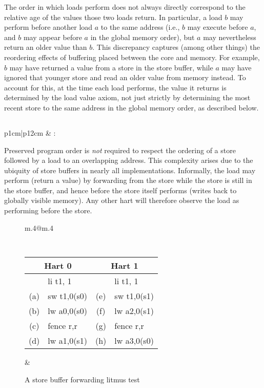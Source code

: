 The order in which loads perform does not always directly correspond to the relative age of the values those two loads return.
In particular, a load $b$ may perform before another load $a$ to the same address (i.e., $b$ may execute before $a$, and $b$ may appear before $a$ in the global memory order), but $a$ may nevertheless return an older value than $b$.
This discrepancy captures (among other things) the reordering effects of buffering placed between the core and memory.
For example, $b$ may have returned a value from a store in the store buffer, while $a$ may have ignored that younger store and read an older value from memory instead.
To account for this, at the time each load performs, the value it returns is determined by the load value axiom, not just strictly by determining the most recent store to the same address in the global memory order, as described below.

\subsection{}
\label{sec:memory:loadvalueaxiom}
\begin{tabular}{p{1cm}|p{12cm}} &
: \loadvalueaxiom
\end{tabular}

Preserved program order is {\em not} required to respect the ordering of a store followed by a load to an overlapping address.
This complexity arises due to the ubiquity of store buffers in nearly all implementations.
Informally, the load may perform (return a value) by forwarding from the store while the store is still in the store buffer, and hence before the store itself performs (writes back to globally visible memory).
Any other hart will therefore observe the load as performing before the store.

\begin{figure}[h!]
  \centering
  \begin{tabular}{m{.4\linewidth}@{\qquad}m{.4\linewidth}}
  {
    \tt\small
    \begin{tabular}{cl||cl}
    \multicolumn{2}{c}{Hart 0} & \multicolumn{2}{c}{Hart 1} \\
    \hline
          & li t1, 1    &     & li t1, 1    \\
      (a) & sw t1,0(s0) & (e) & sw t1,0(s1) \\
      (b) & lw a0,0(s0) & (f) & lw a2,0(s1) \\
      (c) & fence r,r   & (g) & fence r,r   \\
      (d) & lw a1,0(s1) & (h) & lw a3,0(s0) \\
    \end{tabular}
  }
  &
  
  \end{tabular}
  \caption{A store buffer forwarding litmus test}
  \label{fig:litmus:storebuffer}
\end{figure}

